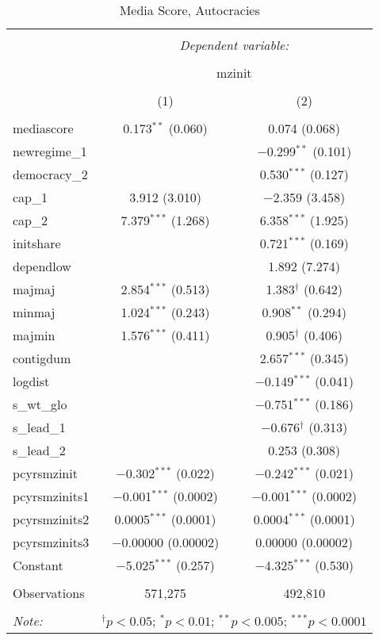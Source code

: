 
\begin{table}[!htbp] \centering 
  \caption{Media Score, Autocracies} 
  \label{} 
\begin{tabular}{@{\extracolsep{5pt}}lcc} 
\\[-1.8ex]\hline 
\hline \\[-1.8ex] 
 & \multicolumn{2}{c}{\textit{Dependent variable:}} \\ 
\cline{2-3} 
\\[-1.8ex] & \multicolumn{2}{c}{mzinit} \\ 
\\[-1.8ex] & (1) & (2)\\ 
\hline \\[-1.8ex] 
 mediascore & 0.173$^{**}$ (0.060) & 0.074 (0.068) \\ 
  newregime\_1 &  & $-$0.299$^{**}$ (0.101) \\ 
  democracy\_2 &  & 0.530$^{***}$ (0.127) \\ 
  cap\_1 & 3.912 (3.010) & $-$2.359 (3.458) \\ 
  cap\_2 & 7.379$^{***}$ (1.268) & 6.358$^{***}$ (1.925) \\ 
  initshare &  & 0.721$^{***}$ (0.169) \\ 
  dependlow &  & 1.892 (7.274) \\ 
  majmaj & 2.854$^{***}$ (0.513) & 1.383$^{\dagger}$ (0.642) \\ 
  minmaj & 1.024$^{***}$ (0.243) & 0.908$^{**}$ (0.294) \\ 
  majmin & 1.576$^{***}$ (0.411) & 0.905$^{\dagger}$ (0.406) \\ 
  contigdum &  & 2.657$^{***}$ (0.345) \\ 
  logdist &  & $-$0.149$^{***}$ (0.041) \\ 
  s\_wt\_glo &  & $-$0.751$^{***}$ (0.186) \\ 
  s\_lead\_1 &  & $-$0.676$^{\dagger}$ (0.313) \\ 
  s\_lead\_2 &  & 0.253 (0.308) \\ 
  pcyrsmzinit & $-$0.302$^{***}$ (0.022) & $-$0.242$^{***}$ (0.021) \\ 
  pcyrsmzinits1 & $-$0.001$^{***}$ (0.0002) & $-$0.001$^{***}$ (0.0002) \\ 
  pcyrsmzinits2 & 0.0005$^{***}$ (0.0001) & 0.0004$^{***}$ (0.0001) \\ 
  pcyrsmzinits3 & $-$0.00000 (0.00002) & 0.00000 (0.00002) \\ 
  Constant & $-$5.025$^{***}$ (0.257) & $-$4.325$^{***}$ (0.530) \\ 
 \hline \\[-1.8ex] 
Observations & 571,275 & 492,810 \\ 
\hline 
\hline \\[-1.8ex] 
\textit{Note:}  & \multicolumn{2}{r}{$^{\dagger} p<0.05$; $^{*} p<0.01$; $^{**} p<0.005$; $^{***} p<0.0001$} \\ 
\end{tabular} 
\end{table} 
